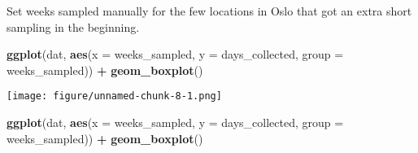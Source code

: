 \documentclass[]{article}
\newenvironment{Shaded}{\begin{snugshade}}{\end{snugshade}}
\newcommand{\CommentTok}[1]{\textcolor[rgb]{0.56,0.35,0.01}{\textit{#1}}}
\newcommand{\DataTypeTok}[1]{\textcolor[rgb]{0.13,0.29,0.53}{#1}}
\newcommand{\DecValTok}[1]{\textcolor[rgb]{0.00,0.00,0.81}{#1}}
\newcommand{\KeywordTok}[1]{\textcolor[rgb]{0.13,0.29,0.53}{\textbf{#1}}}
\newcommand{\NormalTok}[1]{#1}
\newcommand{\OperatorTok}[1]{\textcolor[rgb]{0.81,0.36,0.00}{\textbf{#1}}}
\newcommand{\StringTok}[1]{\textcolor[rgb]{0.31,0.60,0.02}{#1}}
\begin{document}
\begin{Shaded}
\end{Shaded}

Set weeks sampled manually for the few locations in Oslo that got an
extra short sampling in the beginning.

\begin{Shaded}
\begin{Highlighting}[]
\KeywordTok{ggplot}\NormalTok{(dat, }\KeywordTok{aes}\NormalTok{(}\DataTypeTok{x =}\NormalTok{ weeks_sampled, }\DataTypeTok{y =}\NormalTok{ days_collected, }\DataTypeTok{group =}\NormalTok{ weeks_sampled)) }\OperatorTok{+}
\StringTok{  }\KeywordTok{geom_boxplot}\NormalTok{()}
\end{Highlighting}
\end{Shaded}

\texttt{[image: figure/unnamed-chunk-8-1.png]}

\begin{Shaded}
\end{Shaded}

\begin{Shaded}
\begin{Highlighting}[]
\KeywordTok{ggplot}\NormalTok{(dat, }\KeywordTok{aes}\NormalTok{(}\DataTypeTok{x =}\NormalTok{ weeks_sampled, }\DataTypeTok{y =}\NormalTok{ days_collected, }\DataTypeTok{group =}\NormalTok{ weeks_sampled)) }\OperatorTok{+}
\StringTok{  }\KeywordTok{geom_boxplot}\NormalTok{()}
\end{Highlighting}
\end{Shaded}
\end{document}
